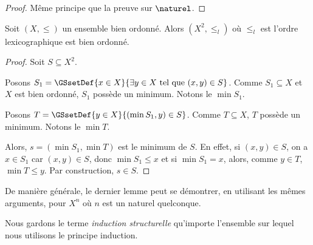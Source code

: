 \begin{proof}
  Même principe que la preuve sur $\naturel$.
\end{proof}

\begin{lemma}
  Soit $(X, \leq)$ un ensemble bien ordonné. Alors $(X^{2}, \leq_{l})$ où
  $\leq_{l}$ est l'ordre lexicographique est bien ordonné.
\end{lemma}

\begin{proof}
  Soit $S \subseteq X^{2}$.

  Posons $S_{1} = \GSsetDef{x \in X}{\exists y \in X \text{ tel que } (x, y) \in S}$.
  Comme $S_{1} \subseteq X$ et $X$ est bien ordonné, $S_{1}$ possède un minimum.
  Notons le $\min{S_{1}}$.

  Posons $T = \GSsetDef{y \in X}{(\min{S_{1}}, y) \in S}$. Comme $T \subseteq
  X$, $T$ possède un minimum. Notons le $\min{T}$.

  Alors, $s = (\min{S_{1}}, \min{T})$ est le minimum de $S$. En effet, si $(x, y)
  \in S$, on a $x \in S_{1}$ car $(x, y) \in S$, donc $\min{S_{1}} \leq x$ et si
  $\min{S_{1}} = x$, alors, comme $y \in T$, $\min{T} \leq y$. Par construction,
  $s \in S$.
\end{proof}

De manière générale, le dernier lemme peut se démontrer, en utilisant les mêmes
arguments, pour $X^{n}$ où $n$ est un naturel quelconque.

Nous gardons le terme \textit{induction structurelle} qu'importe l'ensemble sur
lequel nous utilisons le principe induction.